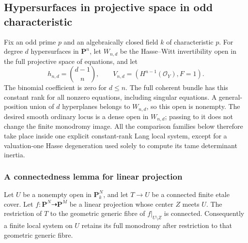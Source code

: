 \subsection{Hypersurfaces in projective space in odd characteristic}
\label{subsec:projective-space-odd-monodromy}

Fix an odd prime $p$ and an algebraically closed field $k$ of
characteristic $p$.  For degree $d$ hypersurfaces in $\mathbf P^n$,
let $W_{n,d}$ be the Hasse--Witt invertibility open in the full
projective space of equations, and let
\[
 h_{n,d}=\binom{d-1}{n},\qquad
 V_{n,d}=\left(H^{n-1}(\mathcal O_Y),F=1\right).
\]
The binomial coefficient is zero for $d\leq n$.
The full coherent bundle has this constant rank for all nonzero
equations, including singular equations.  A general-position union
of $d$ hyperplanes belongs to $W_{n,d}$, so this open is nonempty.
The desired smooth ordinary locus is a dense open in $W_{n,d}$;
passing to it does not change the finite monodromy image.
All the comparison families below therefore take place inside
one explicit constant-rank Lang local system, except for a
valuation-one Hasse degeneration used solely to compute its tame
determinant inertia.

\subsubsection{A connectedness lemma for linear projection}

\begin{lemma}\label{lem:linear-projection-monodromy}
Let $U$ be a nonempty open in $\mathbf P^N_k$, and let
$T\to U$ be a connected finite etale cover.  Let
$f:\mathbf P^N\dashrightarrow\mathbf P^M$ be a linear projection
whose center $Z$ meets $U$.  The restriction of $T$ to the
geometric generic fibre of $f|_{U\setminus Z}$ is connected.
Consequently a finite local system on $U$ retains its full
monodromy after restriction to that geometric generic fibre.
\end{lemma}

